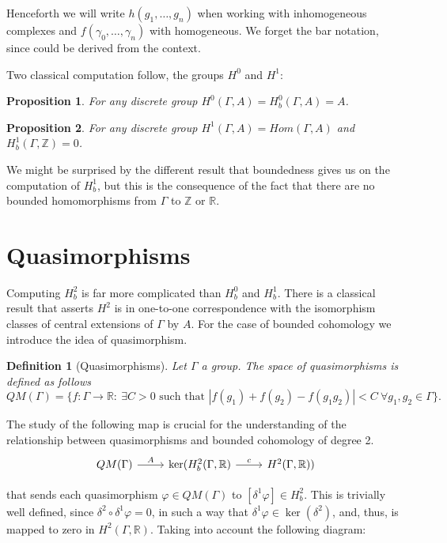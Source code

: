 \documentclass[leqno]{article}
\newtheorem*{proposition}{Proposition}
\newtheorem*{definition}{Definition}
\begin{document}
Henceforth we will write $h(g_1, \ldots, g_n)$ when working with inhomogeneous complexes and $f(\gamma_0, \ldots, \gamma_n)$ with homogeneous. We forget the bar notation, since could be derived from the context.

Two classical computation follow, the groups $H^0$ and  $H^1$:

\begin{proposition}
For any discrete group $H^0(\Gamma , A) = H^0_{b} (\Gamma , A) = A$.
\end{proposition}

\begin{proposition}
For any discrete group $H^1(\Gamma , A) = Hom(\Gamma , A)$  and  $H^1_{b} (\Gamma , \mathbb{Z}) = 0$.
\end{proposition}

We might be surprised by the different result that boundedness gives us on the computation of $H^1_{b}$, but this is the consequence of the fact that there are no bounded homomorphisms from $\Gamma $ to $\mathbb{Z}$ or $\mathbb{R}$.

\section{Quasimorphisms}
Computing $H^2_b$ is far more complicated than  $H^0_b$ and  $H^1_b$. There is a classical result that asserts  $H^2$ is in one-to-one correspondence with the isomorphism classes of central extensions of $\Gamma $ by $A$. For the case of bounded cohomology we introduce the idea of quasimorphism.

 \begin{definition}[Quasimorphisms] Let $\Gamma $ a group. The space of quasimorphisms is defined as follows
   \[
	 QM(\Gamma ) = \{f:\Gamma \to \mathbb{R}: \ \exists C>0 \text{ such that } |f(g_1)+f(g_2)-f(g_1g_2)|<C \ \forall g_1, g_2\in \Gamma  \}   .
   \] 
\end{definition}

The study of the following map is crucial for the understanding of the relationship between quasimorphisms and bounded cohomology of degree 2.
\[\begin{tikzcd}
	{QM(\Gamma)} & {\ker(H_b^2(\Gamma, \mathbb{R})} & {H^2(\Gamma, \mathbb{R}))} 
	\arrow["c", from=1-2, to=1-3]
	\arrow["A", from=1-1, to=1-2]
\end{tikzcd}\]

that sends each quasimorphism $\varphi \in QM(\Gamma )$ to $[\delta^1\varphi ]\in H_b^2$. This is trivially well defined, since $\delta^2\circ \delta^1 \varphi =0$, in such a way that $\delta^1 \varphi  \in \ker(\delta^2)$, and, thus, is mapped to zero in $H^2(\Gamma, \mathbb{R})$. Taking into account the following diagram:
\end{document}
